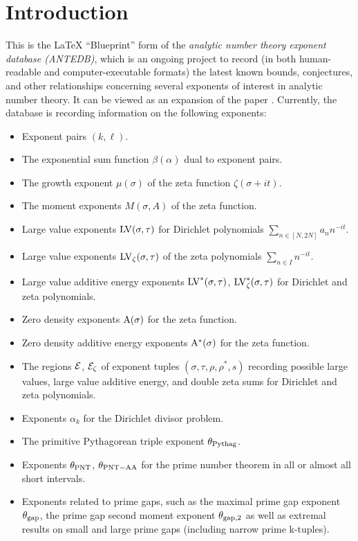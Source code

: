 \chapter{Introduction}\label{intro-chapter}

This is the LaTeX ``Blueprint'' form of the \emph{analytic number theory exponent database (ANTEDB)}, which is an ongoing project to record (in both human-readable and computer-executable formats) the latest known bounds, conjectures, and other relationships concerning several exponents of interest in analytic number theory.  It can be viewed as an expansion of the paper \cite{trudgian-yang}. Currently, the database is recording information on the following exponents:

\begin{itemize}
\item Exponent pairs $(k,\ell)$.
\item The exponential sum function $\beta(\alpha)$ dual to exponent pairs.
\item The growth exponent $\mu(\sigma)$ of the zeta function $\zeta(\sigma+it)$.
\item The moment exponents $M(\sigma,A)$ of the zeta function.
\item Large value exponents $\mathrm{LV}(\sigma, \tau)$ for Dirichlet polynomials $\sum_{n \in [N,2N]} a_n n^{-it}$.
\item Large value exponents $\mathrm{LV}_\zeta(\sigma, \tau)$ of the zeta polynomials $\sum_{n \in I} n^{-it}$.
\item Large value additive energy exponents $\mathrm{LV}^*(\sigma, \tau)$, $\mathrm{LV}^*_\zeta(\sigma, \tau)$ for Dirichlet and zeta polynomials.
\item Zero density exponents $\mathrm{A}(\sigma)$ for the zeta function.
\item Zero density additive energy exponents $\mathrm{A}^*(\sigma)$ for the zeta function.
\item The regions $\mathcal{E}$, $\mathcal{E}_\zeta$ of exponent tuples $(\sigma,\tau,\rho,\rho^*,s)$ recording possible large values, large value additive energy, and double zeta sums for Dirichlet and zeta polynomials.
\item Exponents $\alpha_k$ for the Dirichlet divisor problem.
\item The primitive Pythagorean triple exponent $\theta_{\mathrm{Pythag}}$.
\item Exponents $\theta_{\mathrm{PNT}}$, $\theta_{\mathrm{PNT-AA}}$ for the prime number theorem in all or almost all short intervals.
\item Exponents related to prime gaps, such as the maximal prime gap exponent $\theta_{\mathrm{gap}}$, the prime gap second moment exponent $\theta_{\mathrm{gap},2}$ as well as extremal results on small and large prime gaps (including narrow prime k-tuples).

\end{itemize}
